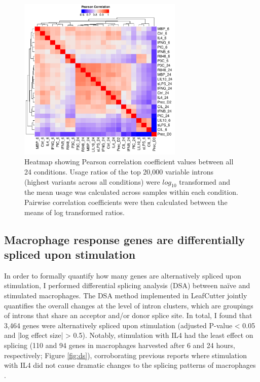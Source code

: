 \begin{figure}[H]
  \centering
  \includegraphics[width=0.7\textwidth]{cond_corr}
  \caption[Correlation heatmap of intron usage ratios]{Heatmap showing Pearson correlation coefficient values between all 24 conditions. Usage ratios of the top 20,000 variable introns (highest variants across all conditions) were $log_{10}$ transformed and the mean usage was calculated across samples within each condition. Pairwise correlation coefficients were then calculated between the means of log transformed ratios.}
  \label{fig:cond_corr}   
\end{figure}

\subsection{Macrophage response genes are differentially spliced upon stimulation}
In order to formally quantify how many genes are alternatively spliced upon stimulation, I performed differential splicing analysis (DSA) between naïve and stimulated macrophages. The DSA method implemented in LeafCutter jointly quantifies the overall changes at the level of intron clusters, which are groupings of introns that share an acceptor and/or donor splice site. In total, I found that 3,464 genes were alternatively spliced upon stimulation (adjusted P-value < 0.05 and |log effect size| > 0.5). Notably, stimulation with IL4 had the least effect on splicing (110 and 94 genes in macrophages harvested after 6 and 24 hours, respectively; Figure \ref{fig:ds}), corroborating previous reports where stimulation with IL4 did not cause dramatic changes to the splicing patterns of macrophages \cite{Liu2018-fh}. \\

